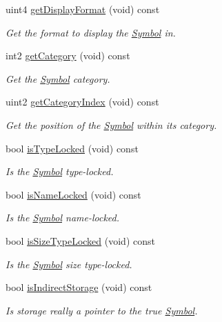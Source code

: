 \begin{DoxyCompactItemize}
uint4 \mbox{\hyperlink{class_symbol_aeb76ebd9391dec38aec6ebb097bba76c}{get\+Display\+Format}} (void) const
\begin{DoxyCompactList}\small\item\em Get the format to display the \mbox{\hyperlink{class_symbol}{Symbol}} in. \end{DoxyCompactList}\item 
int2 \mbox{\hyperlink{class_symbol_a37e66ca8bcc80b64a33a9bde0f26a72d}{get\+Category}} (void) const
\begin{DoxyCompactList}\small\item\em Get the \mbox{\hyperlink{class_symbol}{Symbol}} category. \end{DoxyCompactList}\item 
uint2 \mbox{\hyperlink{class_symbol_a85304f741a156bcecd870ec8614328a5}{get\+Category\+Index}} (void) const
\begin{DoxyCompactList}\small\item\em Get the position of the \mbox{\hyperlink{class_symbol}{Symbol}} within its category. \end{DoxyCompactList}\item 
bool \mbox{\hyperlink{class_symbol_a5c0cc31605bc3b58315e31ec444a9834}{is\+Type\+Locked}} (void) const
\begin{DoxyCompactList}\small\item\em Is the \mbox{\hyperlink{class_symbol}{Symbol}} type-\/locked. \end{DoxyCompactList}\item 
bool \mbox{\hyperlink{class_symbol_a22d63f55585c64549bde68ecf1c9153f}{is\+Name\+Locked}} (void) const
\begin{DoxyCompactList}\small\item\em Is the \mbox{\hyperlink{class_symbol}{Symbol}} name-\/locked. \end{DoxyCompactList}\item 
bool \mbox{\hyperlink{class_symbol_aefe77804a5ec24f78ac90a9ac96c59ff}{is\+Size\+Type\+Locked}} (void) const
\begin{DoxyCompactList}\small\item\em Is the \mbox{\hyperlink{class_symbol}{Symbol}} size type-\/locked. \end{DoxyCompactList}\item 
bool \mbox{\hyperlink{class_symbol_a0a31410a7ede97f106cb72a5fe0e8232}{is\+Indirect\+Storage}} (void) const
\begin{DoxyCompactList}\small\item\em Is storage really a pointer to the true \mbox{\hyperlink{class_symbol}{Symbol}}. \end{DoxyCompactList}\item 

\end{DoxyCompactItemize}
